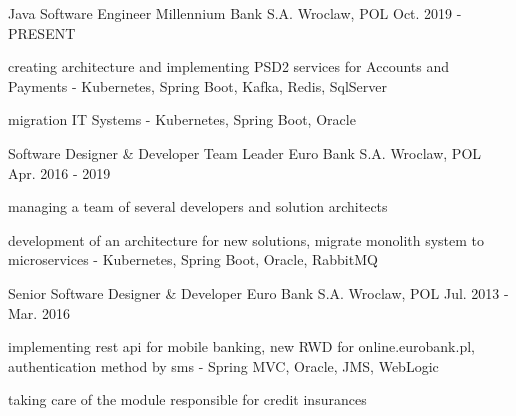

\begin{cventries}

\cventry
{Java Software Engineer } %
{Millennium Bank S.A.} %
{Wroclaw, POL} %
{Oct. 2019 - PRESENT} %
{
	\begin{cvitems} %
		\item {creating architecture and implementing PSD2 services for Accounts and Payments - Kubernetes, Spring Boot, Kafka, Redis, SqlServer}
		\item {migration IT Systems - Kubernetes, Spring Boot, Oracle}
	\end{cvitems}
}


  \cventry
    {Software Designer \& Developer \/ Team Leader} %
    {Euro Bank S.A.} %
    {Wroclaw, POL} %
    {Apr. 2016 - 2019} %
    {
      \begin{cvitems} %
        \item {managing a team of several developers and solution architects}
        \item {development of an architecture for new solutions, migrate monolith system to microservices - Kubernetes, Spring Boot, Oracle, RabbitMQ}
      \end{cvitems}
    }
  \cventry
    {Senior Software Designer \& Developer} %
    {Euro Bank S.A.} %
    {Wroclaw, POL} %
    {Jul. 2013 - Mar. 2016} %
    {
	 	\begin{cvitems} %
			\item {implementing rest api for mobile banking, new RWD for online.eurobank.pl, authentication method by sms - Spring MVC, Oracle, JMS, WebLogic }
		    \item {taking care of the module responsible for credit insurances}
		\end{cvitems}
	}



\end{cventries}
